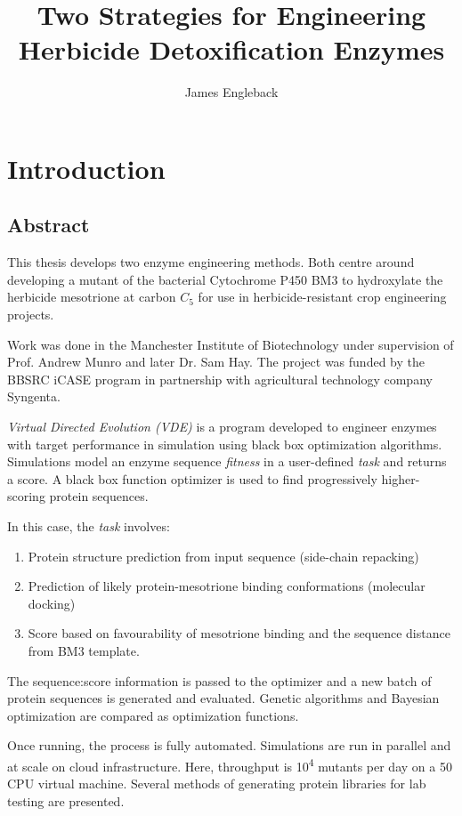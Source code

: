 \documentclass[16pt]{book}
\begin{document}
\title{\textbf{Two Strategies for Engineering Herbicide Detoxification Enzymes}}
\author{James Engleback}
\maketitle
\tableofcontents

\chapter{Introduction}
\section{Abstract}

This thesis develops two enzyme engineering methods.
Both centre around developing a mutant of the bacterial Cytochrome P450 BM3 to hydroxylate the herbicide mesotrione at carbon $C_5$ for use in herbicide-resistant crop engineering projects.

Work was done in the Manchester Institute of Biotechnology under supervision of Prof. Andrew Munro and later Dr. Sam Hay.
The project was funded by the BBSRC iCASE program in partnership with agricultural technology company Syngenta.

\textit{Virtual Directed Evolution (VDE)} is a program developed to engineer enzymes with target performance in simulation using black box optimization algorithms.
Simulations model an enzyme sequence \textit{fitness} in a user-defined \textit{task} and returns a score.
A black box function optimizer is used to find progressively higher-scoring protein sequences.

In this case, the \textit{task} involves:

\begin{enumerate}
	\item Protein structure prediction from input sequence (side-chain repacking)
	\item Prediction of likely protein-mesotrione binding conformations (molecular docking)
	\item Score based on favourability of mesotrione binding and the sequence distance from BM3 template.
\end{enumerate}

The sequence:score information is passed to the optimizer and a new batch of protein sequences is generated and evaluated.
Genetic algorithms and Bayesian optimization are compared as optimization functions.

Once running, the process is fully automated.
Simulations are run in parallel and at scale on cloud infrastructure.
Here, throughput is 10\textsuperscript{4} mutants per day on a 50 CPU virtual machine.
Several methods of generating protein libraries for lab testing are presented.
\end{document}
